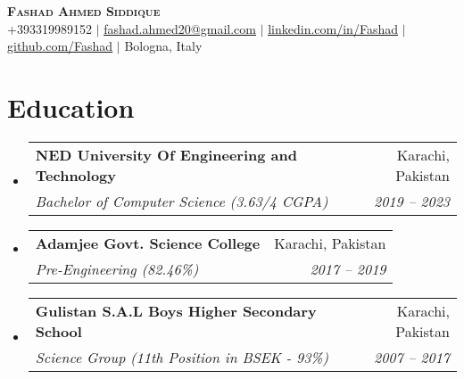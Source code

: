 \documentclass[letterpaper,11pt]{article}
\makeatletter
\newcommand{\resumeSubheading}[4]{
  \vspace{-2pt}\item
    \begin{tabular*}{0.97\textwidth}[t]{l@{\extracolsep{\fill}}r}
      \textbf{#1} & #2 \\
      \textit{\small#3} & \textit{\small #4} \\
    \end{tabular*}\vspace{-7pt}
}
\newcommand{\resumeSubHeadingListStart}{\begin{itemize}[leftmargin=0.15in, label={}]}
\newcommand{\resumeSubHeadingListEnd}{\end{itemize}}
\makeatother
\begin{document}

\begin{center}
    \textbf{\Huge \scshape Fashad Ahmed Siddique} \\ \vspace{1pt}
    \small +393319989152 $|$ \href{mailto:fashad.ahmed20@gmail.com}{\underline{fashad.ahmed20@gmail.com}} $|$ 
    \href{https://www.linkedin.com/in/fashad-ahmed-siddique-285a79207/}{\underline{linkedin.com/in/Fashad}} $|$
    \href{https://github.com/Fashad-Ahmed}{\underline{github.com/Fashad}} $|$
    \small Bologna, Italy
\end{center}


\section{Education}
  \resumeSubHeadingListStart
    \resumeSubheading
      {NED University Of Engineering and Technology}{Karachi, Pakistan}
      {Bachelor of Computer Science (3.63/4 CGPA)}{2019 -- 2023}
    \resumeSubheading
      {Adamjee Govt. Science College}{Karachi, Pakistan}
      {Pre-Engineering (82.46\%)}{2017 -- 2019}
    \resumeSubheading
      {Gulistan S.A.L Boys Higher Secondary School}{Karachi, Pakistan}
      {Science Group (11th Position in BSEK - 93\%)}{2007 -- 2017}
  \resumeSubHeadingListEnd


\end{document}
